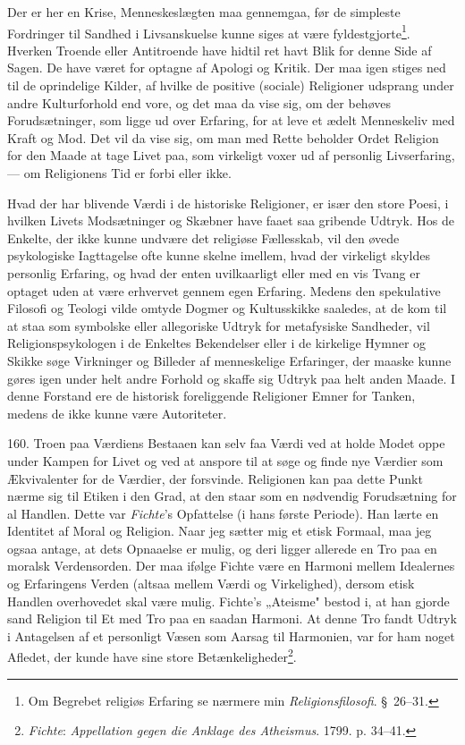 \documentclass[12pt,a4paper]{book}
\newcommand{\apage}[1]{\marginnote{\footnotesize\textit{[#1]}}}
\begin{document}
Der er her en Krise, Menneskeslægten maa gennemgaa, før de simpleste Fordringer til Sandhed i
Livsanskuelse kunne siges at være fyldestgjorte\footnote{Om Begrebet religiøs Erfaring se
nærmere min \emph{Religionsfilosofi}. \S\ 26--31.}. Hverken Troende eller Antitroende have
hidtil ret havt Blik for denne Side af Sagen. De have været for optagne af Apologi og Kritik.
Der maa igen stiges ned til de oprindelige Kilder, af hvilke de positive (sociale) Religioner
udsprang under andre Kulturforhold end vore, og det maa da vise sig, om der behøves
Forudsætninger, som ligge ud over Erfaring, for at leve et ædelt Menneskeliv med Kraft og Mod. Det vil da vise sig, om man med Rette beholder Ordet Religion for den Maade at tage
Livet paa, som virkeligt voxer ud af personlig Livserfaring, --- om Religionens Tid er forbi
eller ikke.

Hvad der har blivende Værdi i de historiske Religioner, er især den store Poesi, i hvilken
Livets Modsætninger og Skæbner have faaet saa gribende Udtryk. Hos de Enkelte, der ikke kunne
undvære det religiøse Fællesskab, vil den øvede psykologiske Iagttagelse ofte kunne skelne
imellem, hvad der virkeligt skyldes personlig Erfaring, og hvad der enten uvilkaarligt eller
med en vis Tvang er optaget uden at være erhvervet gennem egen Erfaring. Medens den
spekulative Filosofi og Teologi vilde omtyde Dogmer og Kultusskikke saaledes, at de kom til
at staa som symbolske eller allegoriske Udtryk for metafysiske Sandheder, vil
Religionspsykologen i de Enkeltes Bekendelser eller i de kirkelige Hymner og Skikke søge
Virkninger og Billeder af menneskelige Erfaringer, der maaske kunne gøres igen under helt
andre Forhold og skaffe sig Udtryk paa helt anden Maade. I denne Forstand ere de historisk
foreliggende \apage{384} Religioner Emner for Tanken, medens de ikke kunne være Autoriteter.

160. Troen paa Værdiens Bestaaen kan selv faa Værdi ved at holde Modet oppe under Kampen for
Livet og ved at anspore til at søge og finde nye Værdier som Ækvivalenter for de Værdier, der
forsvinde. Religionen kan paa dette Punkt nærme sig til Etiken i den Grad, at den staar som
en nødvendig Forudsætning for al Handlen. Dette var \emph{Fichte}'s Opfattelse (i hans første
Periode). Han lærte en Identitet af Moral og Religion. Naar jeg sætter mig et etisk Formaal,
maa jeg ogsaa antage, at dets Opnaaelse er mulig, og deri ligger allerede en Tro paa en
moralsk Verdensorden. Der maa ifølge Fichte være en Harmoni mellem Idealernes og Erfaringens
Verden (altsaa mellem Værdi og Virkelighed), dersom etisk Handlen overhovedet skal være
mulig. Fichte's „Ateisme" bestod i, at han gjorde sand Religion til Et med Tro paa en saadan
Harmoni. At denne Tro fandt Udtryk i Antagelsen af et personligt Væsen som Aarsag til
Harmonien, var for ham noget Afledet, der kunde have sine store
Betænkeligheder\footnote{\emph{Fichte}: \emph{Appellation gegen die Anklage des Atheismus}.
1799. p. 34--41.}.
\end{document}
